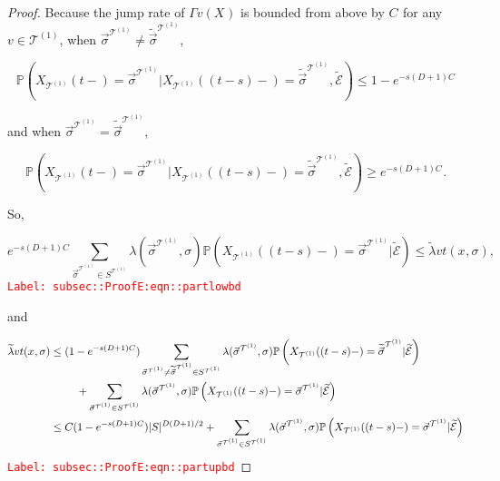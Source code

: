 \documentclass[12pt]{article}
\newcommand{\mb}{\mathbb}
\newcommand{\mc}{\mathcal}
\newcommand{\tr}{\textcolor{red}}
\newcommand{\labe}[1]{\tr{\texttt{Label: #1}}}
\newcommand{\pr}{\mb{P}}							%
\renewcommand{\v}{v}							%
\renewcommand{\S}{S}							%
\newcommand{\s}{\sigma}							%
\newcommand{\sv}{\vec{\s}}						%
\newcommand{\x}{x}								%
\renewcommand{\t}{t}							%
\renewcommand{\tt}{s}							%
\newcommand{\X}{X}								%
\newcommand{\carp}[1]{^{#1}}					%
\newcommand{\vsi}[1]{^{#1}}						%
\newcommand{\cind}[1]{_{#1}}					%
\newcommand{\tp}[1]{(#1)}						%
\newcommand{\tip}[1]{#1}						%
\newcommand{\const}{C}							%
\newcommand{\degr}{D}							%
\newcommand{\tree}{\mc{T}}						%
\newcommand{\sln}[1]{^{(#1)}}						%
\newcommand{\rate}{\lambda}						%
\newcommand{\alt}[1]{\widetilde{#1}}			%
\newcommand{\indx}[1]{_{#1}}					%
\newcommand{\evnt}{\mc{E}}						%
\newcommand{\pmap}{\Gamma}						%
\newcommand{\crate}{\alt{\lambda}}				%
\begin{document}
\begin{proof}
Because the jump rate of \(\pmap{\v}(\X\cind{}\tip{})\) is bounded from above by \(\const\indx{}\) for any \(\v\in\tree\sln{1}\),  when \(\sv\cind{}\vsi{\tree\sln{1}}\neq\alt{\sv}\cind{}\vsi{\tree\sln{1}}\), 

\[\pr\left(\X\cind{\tree\sln{1}}\tp{\t-} = \sv\cind{}\vsi{\tree\sln{1}}|\X\cind{\tree\sln{1}}\tp{(\t-\tt)-}=\alt{\sv}\cind{}\vsi{\tree\sln{1}},\alt{\evnt}{	}\right) \leq 1-e^{-\tt(\degr+1)\const\indx{}}\]

and when \(\sv\cind{}\vsi{\tree\sln{1}}=\alt{\sv}\cind{}\vsi{\tree\sln{1}}\),

\[\pr\left(\X\cind{\tree\sln{1}}\tp{\t-} = \sv\cind{}\vsi{\tree\sln{1}}|\X\cind{\tree\sln{1}}\tp{(\t-\tt)-}=\alt{\sv}\cind{}\vsi{\tree\sln{1}},\alt{\evnt}{	}\right) \geq e^{-\tt(\degr+1)\const\indx{}}.\]

So,

\begin{equation}
e^{-\tt(\degr+1)\const\indx{}}\sum_{\sv\cind{}\vsi{\tree\sln{1}}\in \S\carp{\tree\sln{1}}} \rate{}(\sv\cind{}\vsi{\tree\sln{1}},\s)\pr\left(\X\cind{\tree\sln{1}}\tp{(\t-\tt)-}=\sv\cind{}\vsi{\tree\sln{1}}|\alt{\evnt}{	}\right) \leq \crate{\v}{\t}(\x\cind{}\tip{},\s),
\label{subsec::ProofE:eqn::partlowbd}
\end{equation}
\labe{subsec::ProofE:eqn::partlowbd}

and

\begin{align}
\crate{\v}{\t}(\x\cind{}\tip{},\s)&\leq (1 - e^{-\tt(\degr+1)\const\indx{}})\sum_{\sv\cind{}\vsi{\tree\sln{1}}\neq \alt{\sv}\cind{}\vsi{\tree\sln{1}} \in \S\carp{\tree\sln{1}}} \rate{}(\sv\cind{}\vsi{\tree\sln{1}},\s)\pr\left(\X\cind{\tree\sln{1}}\tp{(\t-\tt)-}=\alt{\sv}\cind{}\vsi{\tree\sln{1}}|\alt{\evnt}{	}\right)\nonumber\\
&\hspace{24 pt} +\sum_{\sv\cind{}\vsi{\tree\sln{1}} \in \S\carp{\tree\sln{1}}} \rate{}(\sv\cind{}\vsi{\tree\sln{1}},\s)\pr\left(\X\cind{\tree\sln{1}}\tp{(\t-\tt)-}=\sv\cind{}\vsi{\tree\sln{1}}|\alt{\evnt}{	}\right)\nonumber\\
&\leq \const\indx{}(1 - e^{-\tt(\degr+1)\const\indx{}})|\S|^{\degr(\degr+1)/2} + \sum_{\sv\cind{}\vsi{\tree\sln{1}} \in \S\carp{\tree\sln{1}}} \rate{}(\sv\cind{}\vsi{\tree\sln{1}},\s)\pr\left(\X\cind{\tree\sln{1}}\tp{(\t-\tt)-}=\sv\cind{}\vsi{\tree\sln{1}}|\alt{\evnt}{	}\right)
\label{subsec::ProofE:eqn::partupbd}
\end{align}
\labe{subsec::ProofE:eqn::partupbd}


\end{proof}
\end{document}
